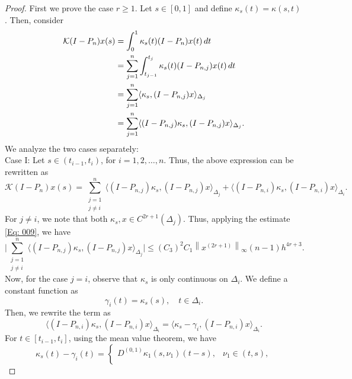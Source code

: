 \documentclass[pdflatex, sn-mathphys-num]{sn-jnl}%
\newcommand{\norm}[1]{\left\lVert #1\right\rVert}
\theoremstyle{thmstyleone}%
\theoremstyle{thmstyletwo}%
\theoremstyle{thmstylethree}%
\begin{document}
\begin{proof} First we prove the case \(r \geq 1\).
	Let \(s \in [0,1]\) and define \(\kappa_s(t) = \kappa(s,t)\). Then, consider
	\begin{align} \label{Eq: 0024}
		\mathcal{K}(I - P_n)x(s) &= \int_{0}^{1} \kappa_s(t) (I - P_n) x(t) \, dt \notag \\
		&= \sum_{j=1}^{n} \int_{t_{j-1}}^{t_j} \kappa_s(t) (I - P_{n,j}) x(t) \, dt \notag \\
		&= \sum_{j=1}^{n} \langle \kappa_s, (I - P_{n,j}) x \rangle_{\Delta_j}  \notag \\
		&= \sum_{j=1}^{n} \langle (I - P_{n,j}) \kappa_s, (I - P_{n,j}) x \rangle_{\Delta_j}.
	\end{align}
	We analyze the two cases separately:\\
	\noindent
	Case I: Let $s \in (t_{i-1}, t_i)$, for $i = 1,2,\ldots,n$. Thus, the above expression can be rewritten as
	\begin{equation} \label{Eq: 0025}
		\mathcal{K}(I - P_n)x(s) = \sum_{\substack{j=1 \\  j\ne i} }^{n} \langle (I - P_{n,j}) \kappa_s, (I - P_{n,j}) x \rangle_{\Delta_j} + \langle (I - P_{n,i}) \kappa_s, (I - P_{n,i}) x \rangle_{\Delta_i}.
	\end{equation}
	For $j \neq i$, we note that both $\kappa_s, x \in C^{2r+1}(\Delta_j)$. Thus, applying the estimate \eqref{Eq: 009}, we have
	\begin{equation} \label{Eq: 0026}
		\bigg|\sum_{\substack{j=1 \\  j\ne i} }^{n} \langle (I - P_{n,j}) \kappa_s, (I - P_{n,j}) x \rangle_{\Delta_j}\bigg|\leq (C_3)^2 C_1 \norm{x^{(2r+1)}}_\infty (n-1) h^{4r+3}.
	\end{equation}
	Now, for the case $j = i$, observe that $\kappa_s$ is only continuous on $\Delta_i$. We define a constant function as
	\begin{equation*}
		\gamma_i(t) = \kappa_s(s), \quad t \in \Delta_i.
	\end{equation*}
	Then, we rewrite the term as
	\begin{equation*}
		\langle (I - P_{n,i}) \kappa_s, (I - P_{n,i}) x \rangle_{\Delta_i} = \langle \kappa_s - \gamma_i, (I - P_{n,i}) x \rangle_{\Delta_i}.
	\end{equation*}
	For $t \in [t_{i-1}, t_i]$, using the mean value theorem, we have
	\begin{equation*}
		\kappa_s(t) - \gamma_i(t) = \begin{cases}
			D^{(0,1)} \kappa_1(s, \nu_1) (t - s), & \nu_1 \in (t, s), \\

\end{cases}
\end{equation*}
\end{proof}
\end{document}
